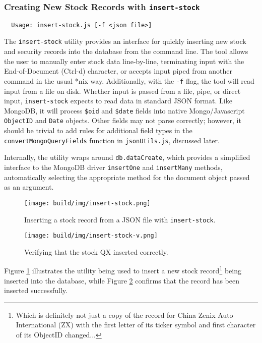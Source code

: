 \documentclass[
11pt,
titlepage,
]{article}
\begin{document}
\subsubsection{Creating New Stock Records with \texttt{insert-stock}}

\begin{lstlisting}
  Usage: insert-stock.js [-f <json file>]
\end{lstlisting}

The \texttt{insert-stock} utility provides an interface for quickly inserting
new stock and security records into the database from the command line. The tool
allows the user to manually enter stock data line-by-line, terminating input
with the End-of-Document (Ctrl-d) character, or accepts input piped from another
command in the usual *nix way. Additionally, with the \texttt{-f} flag, the tool
will read input from a file on disk. Whether input is passed from a file, pipe,
or direct input, \texttt{insert-stock} expects to read data in standard JSON
format. Like MongoDB, it will process \texttt{\$oid} and \texttt{\$date} fields
into native Mongo/Javascript \texttt{ObjectID} and \texttt{Date} objects. Other
fields may not parse correctly; however, it should be trivial to add rules for
additional field types in the \texttt{convertMongoQueryFields} function in
\texttt{jsonUtils.js}, discussed later.

Internally, the utility wraps around \texttt{db.dataCreate}, which provides
a simplified interface to the MongoDB driver \texttt{insertOne} and
\texttt{insertMany} methods, automatically selecting the appropriate method
for the document object passed as an argument.

\begin{figure}[bp]
  \texttt{[image: build/img/insert-stock.png]}
  \caption{Inserting a stock record from a JSON file with
    \texttt{insert-stock}.}
  \label{fig:insert-stock}
\end{figure}

\begin{figure}[tbp]
  \texttt{[image: build/img/insert-stock-v.png]}
  \caption{Verifying that the stock QX inserted correctly.}
  \label{fig:insert-stock-v}
\end{figure}

Figure \ref{fig:insert-stock} illustrates the utility being used to insert a new
stock record\footnote{Which is definitely not just a copy of the record for
China Zenix Auto International (ZX) with the first letter of its ticker symbol
and first character of its ObjectID changed...} being inserted into the
database, while Figure \ref{fig:insert-stock-v} confirms that the record has
been inserted successfully.
\end{document}
